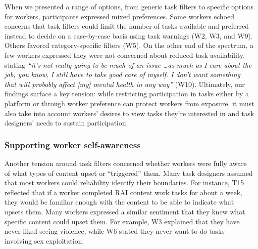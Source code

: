 When we presented a range of options, from generic task filters to specific options for workers, participants expressed mixed preferences. Some workers echoed concerns that task filters could limit the number of tasks available and preferred instead to decide on a case-by-case basis using task warnings (W2, W3, and W9). Others favored category-specific filters (W5). On the other end of the spectrum, a few workers expressed they were not concerned about reduced task availability, stating \textit{``it's not really going to be much of an issue \dots as much as I care about the job, you know, I still have to take good care of myself. I don't want something that will probably affect [my] mental health in any way''} (W10). Ultimately, our findings surface a key tension: while restricting participation in tasks either by a platform or through worker preference can protect workers from exposure, it must also take into account workers' desires to view tasks they're interested in and task designers' needs to sustain participation. 

\subsubsection{Supporting worker self-awareness}
Another tension around task filters concerned whether workers were fully aware of what types of content upset or ``triggered'' them. Many task designers assumed that most workers could reliability identify their boundaries. For instance, T15 reflected that if a worker completed RAI content work tasks for about a week, they would be familiar enough with the content to be able to indicate what upsets them. Many workers expressed a similar sentiment that they knew what specific content could upset them. For example, W3 explained that they have never liked seeing violence, while W6 stated they never want to do tasks involving sex exploitation. 

